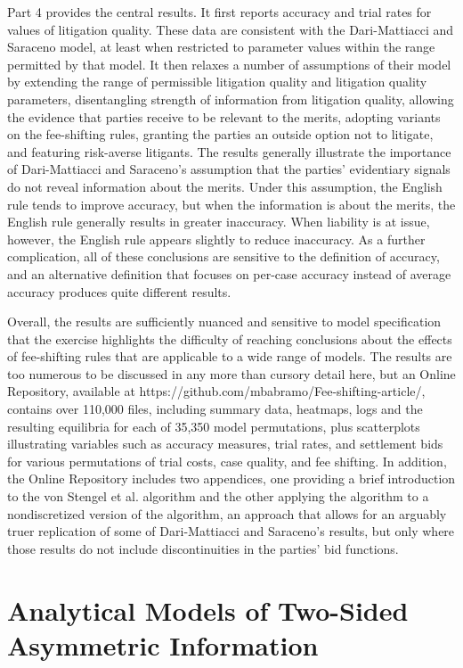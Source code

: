 \documentclass{article}
\begin{document}
Part 4 provides the central results. It first reports accuracy and trial rates for values of litigation quality. These data are consistent with the Dari-Mattiacci and Saraceno model, at least when restricted to parameter values within the range permitted by that model. It then relaxes a number of assumptions of their model by extending the range of permissible litigation quality and litigation quality parameters, disentangling strength of information from litigation quality, allowing the evidence that parties receive to be relevant to the merits, adopting variants on the fee-shifting rules, granting the parties an outside option not to litigate, and featuring risk-averse litigants. The results generally illustrate the importance of Dari-Mattiacci and Saraceno's assumption that the parties' evidentiary signals do not reveal information about the merits. Under this assumption, the English rule tends to improve accuracy, but when the information is about the merits, the English rule generally results in greater inaccuracy. When liability is at issue, however, the English rule appears slightly to reduce inaccuracy. As a further complication, all of these conclusions are sensitive to the definition of accuracy, and an alternative definition that focuses on per-case accuracy instead of average accuracy produces quite different results. 

Overall, the results are sufficiently nuanced and sensitive to model specification that the exercise highlights the difficulty of reaching conclusions about the effects of fee-shifting rules that are applicable to a wide range of models. The results are too numerous to be discussed in any more than cursory detail here, but an Online Repository, available at https://github.com/mbabramo/Fee-shifting-article/, contains over 110,000 files, including summary data, heatmaps, logs and the resulting equilibria for each of 35,350 model permutations, plus scatterplots illustrating variables such as accuracy measures, trial rates, and settlement bids for various permutations of trial costs, case quality, and fee shifting. In addition, the Online Repository includes two appendices, one providing a brief introduction to the von Stengel et al. algorithm and the other applying the algorithm to a nondiscretized version of the algorithm, an approach that allows for an arguably truer replication of some of Dari-Mattiacci and Saraceno's results, but only where those results do not include discontinuities in the parties' bid functions.

\section{Analytical Models of Two-Sided Asymmetric Information}
\end{document}
